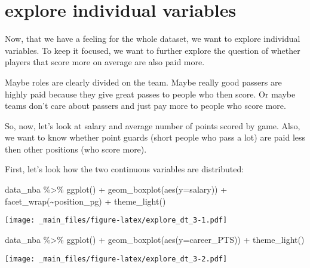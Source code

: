 \documentclass[
]{book}
\newenvironment{Shaded}{\begin{snugshade}}{\end{snugshade}}
\newcommand{\AttributeTok}[1]{\textcolor[rgb]{0.77,0.63,0.00}{#1}}
\newcommand{\FunctionTok}[1]{\textcolor[rgb]{0.00,0.00,0.00}{#1}}
\newcommand{\NormalTok}[1]{#1}
\newcommand{\SpecialCharTok}[1]{\textcolor[rgb]{0.00,0.00,0.00}{#1}}
\begin{document}
\hypertarget{explore-individual-variables}{%
\section{explore individual variables}\label{explore-individual-variables}}

Now, that we have a feeling for the whole dataset, we want to explore individual
variables. To keep it focused, we want to further explore the question
of whether players that score more on average are also paid more.

Maybe roles are clearly divided on the team. Maybe really good passers are highly
paid because they give great passes to people who then score. Or maybe teams
don't care about passers and just pay more to people who score more.

So, now, let's look at salary and average number of points scored by game.
Also, we want to know whether point guards (short people who pass a lot) are
paid less then other positions (who score more).

First, let's look how the two continuous variables are distributed:

\begin{Shaded}
\begin{Highlighting}[]
\NormalTok{data\_nba }\SpecialCharTok{\%\textgreater{}\%} \FunctionTok{ggplot}\NormalTok{() }\SpecialCharTok{+} 
\FunctionTok{geom\_boxplot}\NormalTok{(}\FunctionTok{aes}\NormalTok{(}\AttributeTok{y=}\NormalTok{salary)) }\SpecialCharTok{+}
  \FunctionTok{facet\_wrap}\NormalTok{(}\SpecialCharTok{\textasciitilde{}}\NormalTok{position\_pg) }\SpecialCharTok{+}
  \FunctionTok{theme\_light}\NormalTok{()}
\end{Highlighting}
\end{Shaded}

\texttt{[image: \_main\_files/figure-latex/explore\_dt\_3-1.pdf]}

\begin{Shaded}
\begin{Highlighting}[]
\NormalTok{data\_nba }\SpecialCharTok{\%\textgreater{}\%} \FunctionTok{ggplot}\NormalTok{() }\SpecialCharTok{+} 
\FunctionTok{geom\_boxplot}\NormalTok{(}\FunctionTok{aes}\NormalTok{(}\AttributeTok{y=}\NormalTok{career\_PTS)) }\SpecialCharTok{+} 
  \FunctionTok{theme\_light}\NormalTok{()}
\end{Highlighting}
\end{Shaded}

\texttt{[image: \_main\_files/figure-latex/explore\_dt\_3-2.pdf]}
\end{document}
